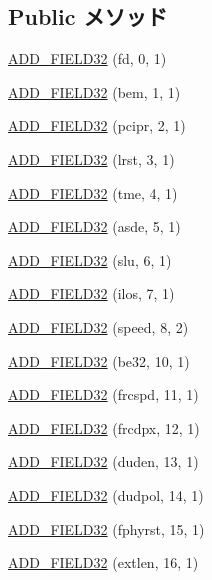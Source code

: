 \subsection*{Public メソッド}
\begin{DoxyCompactItemize}
\item 
\hyperlink{structiGbReg_1_1Regs_1_1CTRL_a03e5dea6349337c8756f6003f2d02adc}{ADD\_\-FIELD32} (fd, 0, 1)
\item 
\hyperlink{structiGbReg_1_1Regs_1_1CTRL_ac09b887111c3854f969a8fca713f6e1d}{ADD\_\-FIELD32} (bem, 1, 1)
\item 
\hyperlink{structiGbReg_1_1Regs_1_1CTRL_a19d35ba8424865d55001e5abbe45a5e9}{ADD\_\-FIELD32} (pcipr, 2, 1)
\item 
\hyperlink{structiGbReg_1_1Regs_1_1CTRL_af115c6f5ec5dc0ba71952ea7012530f6}{ADD\_\-FIELD32} (lrst, 3, 1)
\item 
\hyperlink{structiGbReg_1_1Regs_1_1CTRL_ade43c7dcbc3af7cbee7ba6e4fd996e77}{ADD\_\-FIELD32} (tme, 4, 1)
\item 
\hyperlink{structiGbReg_1_1Regs_1_1CTRL_ab32084a0dbc804e3b0cf56cb0a63c5f9}{ADD\_\-FIELD32} (asde, 5, 1)
\item 
\hyperlink{structiGbReg_1_1Regs_1_1CTRL_a9e0d0244d457bccdcfb26ecd343bffd0}{ADD\_\-FIELD32} (slu, 6, 1)
\item 
\hyperlink{structiGbReg_1_1Regs_1_1CTRL_a8b2e0f289ac00ab3ed115f324a5639c8}{ADD\_\-FIELD32} (ilos, 7, 1)
\item 
\hyperlink{structiGbReg_1_1Regs_1_1CTRL_a4ef45abbd3f9b421d585fd24cd86961f}{ADD\_\-FIELD32} (speed, 8, 2)
\item 
\hyperlink{structiGbReg_1_1Regs_1_1CTRL_a0b065b13426edf694c97d3c3a28d9a9e}{ADD\_\-FIELD32} (be32, 10, 1)
\item 
\hyperlink{structiGbReg_1_1Regs_1_1CTRL_a4d239cafbad3fd551aa28ad199661528}{ADD\_\-FIELD32} (frcspd, 11, 1)
\item 
\hyperlink{structiGbReg_1_1Regs_1_1CTRL_a2d06c9f010bbd489a3ee087fcf3081ac}{ADD\_\-FIELD32} (frcdpx, 12, 1)
\item 
\hyperlink{structiGbReg_1_1Regs_1_1CTRL_ac9d066339c7bd68daba465df108f669d}{ADD\_\-FIELD32} (duden, 13, 1)
\item 
\hyperlink{structiGbReg_1_1Regs_1_1CTRL_aef88c7fe587b8dff825b15e9fcf1e147}{ADD\_\-FIELD32} (dudpol, 14, 1)
\item 
\hyperlink{structiGbReg_1_1Regs_1_1CTRL_a8d9d4e6dbf2619f40c43ee16474de1d1}{ADD\_\-FIELD32} (fphyrst, 15, 1)
\item 
\hyperlink{structiGbReg_1_1Regs_1_1CTRL_a8e210159886239b69abc07eb86b4f56c}{ADD\_\-FIELD32} (extlen, 16, 1)

\end{DoxyCompactItemize}

